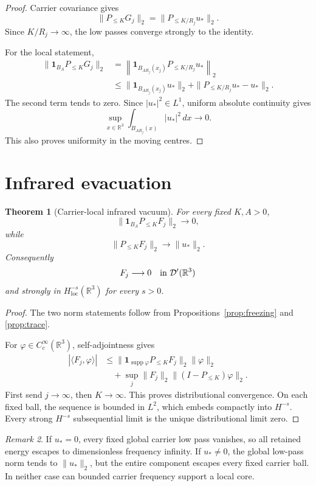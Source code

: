 \documentclass[11pt]{article}
\newtheorem{theorem}{Theorem}
\theoremstyle{remark}
\newtheorem{remark}[theorem]{Remark}
\newcommand{\R}{\mathbb R}
\newcommand{\Plo}[1]{P_{\le #1}}
\begin{document}
\begin{proof}
Carrier covariance gives
\[
 \|\Plo K G_j\|_2
 =
 \|\Plo{K/R_j}u_*\|_2.
\]
Since \(K/R_j\to\infty\), the low passes converge strongly to the identity.

For the local statement,
\[
\begin{aligned}
 \|\mathbf1_{B_A}\Plo K G_j\|_2
 &=
 \left\|
 \mathbf1_{B_{AR_j}(x_j)}
 \Plo{K/R_j}u_*
 \right\|_2\\
 &\le
 \|\mathbf1_{B_{AR_j}(x_j)}u_*\|_2
 +
 \|\Plo{K/R_j}u_*-u_*\|_2.
\end{aligned}
\]
The second term tends to zero.  Since \(|u_*|^2\in L^1\), uniform absolute
continuity gives
\[
 \sup_{x\in\R^3}
 \int_{B_{AR_j}(x)}|u_*|^2\,dx
 \longrightarrow0.
\]
This also proves uniformity in the moving centres.
\end{proof}

\section{Infrared evacuation}

\begin{theorem}[Carrier-local infrared vacuum]
\label{thm:vacuum}
For every fixed \(K,A>0\),
\[
 \boxed{
 \|\mathbf1_{B_A}\Plo K F_j\|_2\longrightarrow0,
 }
\]
while
\[
 \boxed{
 \|\Plo K F_j\|_2\longrightarrow\|u_*\|_2.
 }
\]
Consequently
\[
 F_j\longrightarrow0
 \quad\hbox{in }\mathcal D'(\R^3)
\]
and strongly in \(H^{-s}_{\mathrm{loc}}(\R^3)\) for every \(s>0\).
\end{theorem}

\begin{proof}
The two norm statements follow from
Propositions~\ref{prop:freezing} and \ref{prop:trace}.

For \(\varphi\in C_c^\infty(\R^3)\), self-adjointness gives
\[
\begin{aligned}
 |\langle F_j,\varphi\rangle|
 &\le
 \|\mathbf1_{\operatorname{supp}\varphi}\Plo K F_j\|_2
 \|\varphi\|_2\\
 &\quad+
 \sup_j\|F_j\|_2
 \|(I-\Plo K)\varphi\|_2.
\end{aligned}
\]
First send \(j\to\infty\), then \(K\to\infty\).  This proves
distributional convergence.  On each fixed ball, the sequence is bounded in
\(L^2\), which embeds compactly into \(H^{-s}\).  Every strong
\(H^{-s}\) subsequential limit is the unique distributional limit zero.
\end{proof}

\begin{remark}
If \(u_*=0\), every fixed global carrier low pass vanishes, so all retained
energy escapes to dimensionless frequency infinity.  If \(u_*\ne0\), the
global low-pass norm tends to \(\|u_*\|_2\), but the entire component escapes
every fixed carrier ball.  In neither case can bounded carrier frequency
support a local core.
\end{remark}
\end{document}
